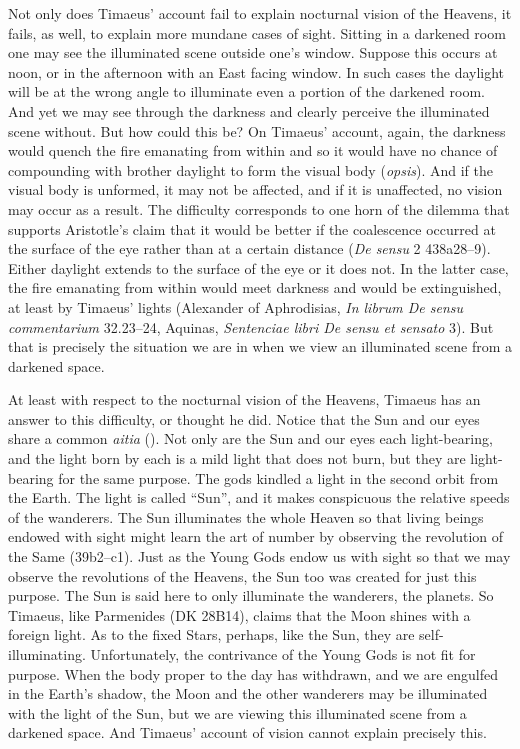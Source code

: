 Not only does Timaeus' account fail to explain nocturnal vision of the Heavens, it fails, as well, to explain more mundane cases of sight. Sitting in a darkened room one may see the illuminated scene outside one's window. Suppose this occurs at noon, or in the afternoon with an East facing window. In such cases the daylight will be at the wrong angle to illuminate even a portion of the darkened room. And yet we may see through the darkness and clearly perceive the illuminated scene without. But how could this be? On Timaeus' account, again, the darkness would quench the fire emanating from within and so it would have no chance of compounding with brother daylight to form the visual body (\emph{opsis}). And if the visual body is unformed, it may not be affected, and if it is unaffected, no vision may occur as a result. The difficulty corresponds to one horn of the dilemma that supports Aristotle's claim that it would be better if the coalescence occurred at the surface of the eye rather than at a certain distance (\emph{De sensu} 2 438a28--9). Either daylight extends to the surface of the eye or it does not. In the latter case, the fire emanating from within would meet darkness and would be extinguished, at least by Timaeus' lights (Alexander of Aphrodisias, \emph{In librum De sensu commentarium} 32.23--24, Aquinas, \emph{Sentenciae libri De sensu et sensato} 3). But that is precisely the situation we are in when we view an illuminated scene from a darkened space.

At least with respect to the nocturnal vision of the Heavens, Timaeus has an answer to this difficulty, or thought he did. Notice that the Sun and our eyes share a common \emph{aitia} (\citealt[112]{Johansen:2004dx}). Not only are the Sun and our eyes each light-bearing, and the light born by each is a mild light that does not burn, but they are light-bearing for the same purpose. The gods kindled a light in the second orbit from the Earth.  The light is called ``Sun'', and it makes conspicuous the relative speeds of the wanderers. The Sun illuminates the whole Heaven so that living beings endowed with sight might learn the art of number by observing the revolution of the Same (39b2--c1). Just as the Young Gods endow us with sight so that we may observe the revolutions of the Heavens, the Sun too was created for just this purpose. The Sun is said here to only illuminate the wanderers, the planets. So Timaeus, like Parmenides (DK 28B14), claims that the Moon shines with a foreign light. As to the fixed Stars, perhaps, like the Sun, they are self-illuminating. Unfortunately, the contrivance of the Young Gods is not fit for purpose. When the body proper to the day has withdrawn, and we are engulfed in the Earth's shadow, the Moon and the other wanderers may be illuminated with the light of the Sun, but we are viewing this illuminated scene from a darkened space. And Timaeus' account of vision cannot explain precisely this.

